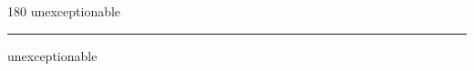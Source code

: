 
\begin{frame}
\begin{center}
\begin{turn}{180}
{\fontsize{2.5cm}{1em}\selectfont unexceptionable}
\end{turn}
\vspace{1em}\par  
\hrule
\vspace{1em}\par  
{\fontsize{2.5cm}{1em}\selectfont unexceptionable}
\end{center}
\end{frame}
